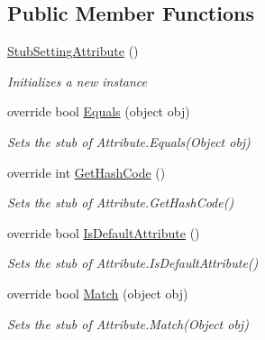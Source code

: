 \subsection*{Public Member Functions}
\begin{DoxyCompactItemize}
\item 
\hyperlink{class_system_1_1_configuration_1_1_fakes_1_1_stub_setting_attribute_a47e619294054d3163c7f9f8d354c6178}{Stub\-Setting\-Attribute} ()
\begin{DoxyCompactList}\small\item\em Initializes a new instance\end{DoxyCompactList}\item 
override bool \hyperlink{class_system_1_1_configuration_1_1_fakes_1_1_stub_setting_attribute_adef23ced938377cdaf09c30c6752fb32}{Equals} (object obj)
\begin{DoxyCompactList}\small\item\em Sets the stub of Attribute.\-Equals(\-Object obj)\end{DoxyCompactList}\item 
override int \hyperlink{class_system_1_1_configuration_1_1_fakes_1_1_stub_setting_attribute_a1623f0686843d4075c313d3bdceaf209}{Get\-Hash\-Code} ()
\begin{DoxyCompactList}\small\item\em Sets the stub of Attribute.\-Get\-Hash\-Code()\end{DoxyCompactList}\item 
override bool \hyperlink{class_system_1_1_configuration_1_1_fakes_1_1_stub_setting_attribute_a1ee5d8085652513eb26b667111a692ac}{Is\-Default\-Attribute} ()
\begin{DoxyCompactList}\small\item\em Sets the stub of Attribute.\-Is\-Default\-Attribute()\end{DoxyCompactList}\item 
override bool \hyperlink{class_system_1_1_configuration_1_1_fakes_1_1_stub_setting_attribute_a46b5a52d82cd04f213dbd068af925fbf}{Match} (object obj)
\begin{DoxyCompactList}\small\item\em Sets the stub of Attribute.\-Match(\-Object obj)\end{DoxyCompactList}\end{DoxyCompactItemize}
